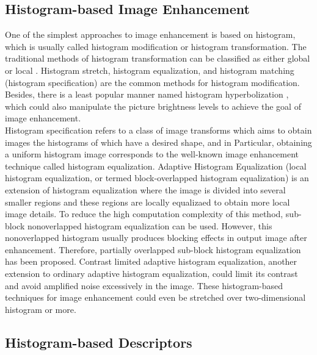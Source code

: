 \documentclass{article}
\begin{document}
\subsection{Histogram-based Image Enhancement}
One of the simplest approaches to image enhancement is based on histogram, which is usually called histogram modification or histogram transformation. The traditional methods of histogram transformation can be classified as either global\cite{Modification1978,Sapiro1997,Arici2009} or local \cite{Caselles1999}. Histogram stretch\cite{Alparslan1981}, histogram equalization\cite{Kundu1998}, and histogram matching (histogram specification)\cite{Coltuc2006,Wan2007,Mignotte2011,Sen2011} are the common methods for histogram modification. Besides, there is a least popular manner named histogram hyperbolization \cite{Nahin1979}, which could also manipulate the picture brightness levels to achieve the goal of image enhancement.\\
Histogram specification refers to a class of image transforms which aims to obtain images the histograms of which have a desired shape, and in Particular, obtaining a uniform histogram image corresponds to the well-known image enhancement technique called histogram equalization. Adaptive Histogram Equalization (local histogram equalization, or termed block-overlapped histogram equalization) is an extension of histogram equalization where the image is divided into several smaller regions and these regions are locally equalizaed to obtain more local image details. To reduce the high computation complexity of this method, sub-block nonoverlapped histogram equalization can be used. However, this nonoverlapped histogram usually produces blocking effects in output image after enhancement. Therefore, partially overlapped sub-block histogram equalization has been proposed\cite{Kim2001}. Contrast limited adaptive histogram equalization,	another extension to ordinary adaptive histogram equalization,  could limit its contrast and avoid amplified noise excessively in the image\cite{Zhu1999}. These histogram-based techniques for image enhancement could even be stretched over two-dimensional histogram or more\cite{Celik2012}.
\subsection{Histogram-based Descriptors}

 








\end{document}
